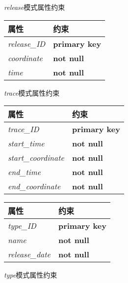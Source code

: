\begin{figure}[!htp]
    \begin{minipage}{0.3\textwidth}
      \centering
      \caption{\textit{release}模式属性约束}
      \label{tab:constraintrelease}
      \begin{tabular}{ll}\toprule
        属性&约束\\\midrule
       \textit{release\_ID}&\textbf{primary key}\\
       \textit{coordinate}&\textbf{not null}\\
       \textit{time}&\textbf{not null}\\
       \bottomrule
      \end{tabular}
    \end{minipage}\hfill
    \begin{minipage}{0.3\textwidth}
      \centering
      \caption{\textit{trace}模式属性约束}
      \label{tab:constrainttrace}
      \begin{tabular}{ll}\toprule
        属性&约束\\\midrule
       \textit{trace\_ID}&\textbf{primary key}\\
       \textit{start\_time}&\textbf{not null}\\
       \textit{start\_coordinate}&\textbf{not null}\\
       \textit{end\_time}&\textbf{not null}\\
       \textit{end\_coordinate}&\textbf{not null}\\
       \bottomrule
      \end{tabular}
    \end{minipage}\hfill
    \begin{minipage}{0.3\textwidth}
      \centering
      \caption{\textit{type}模式属性约束}
      \label{tab:constrainttype}
      \begin{tabular}{ll}\toprule
        属性&约束\\\midrule
       \textit{type\_ID}&\textbf{primary key}\\
       \textit{name}&\textbf{not null}\\
       \textit{release\_date}&\textbf{not null}\\
       \bottomrule
      \end{tabular}
    \end{minipage}\hfill
  \end{figure}
